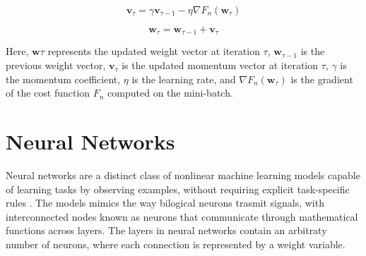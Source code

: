 \documentclass[a4paper, UKenglish, 11pt]{uiomaster}
\begin{document}
\begin{equation}
\textbf{v}_{\tau} = \gamma\textbf{v}_{\tau-1} - \eta\nabla F_n(\textbf{w}_{\tau})
\end{equation}

\begin{equation}
\textbf{w}_{\tau} = \textbf{w}_{\tau-1} + \textbf{v}_{\tau}
\end{equation}

Here, $\textbf{w}{\tau}$ represents the updated weight vector at iteration $\tau$, $\textbf{w}_{\tau-1}$ is the previous weight vector, $\textbf{v}_{\tau}$ is the updated momentum vector at iteration $\tau$, $\gamma$ is the momentum coefficient, $\eta$ is the learning rate, and $\nabla F_n(\textbf{w}_{\tau})$ is the gradient of the cost function $F_n$ computed on the mini-batch.



%
%
%
%




\section{Neural Networks}
Neural networks are a distinct class of nonlinear machine learning models capable of learning tasks by observing examples, without requiring explicit task-specific rules \cite{Hjorth-Jensen2022}. The models mimics the way bilogical neurons trasmit signals, with interconnected nodes known as neurons that communicate through mathematical functions across layers. The layers in neural networks contain an arbitraty number of neurons, where each connection is represented by a weight variable.
\end{document}
